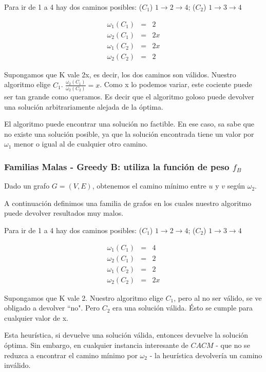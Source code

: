 Para ir de 1 a 4 hay dos caminos posibles: ($C_1$) $1 \rightarrow 2 \rightarrow 4$; ($C_2$) $1 \rightarrow 3 \rightarrow 4$

\begin{eqnarray}
 \omega_1(C_1) &=& 2 	\\ 
 \omega_2(C_1) &=& 2x	\\
 \omega_1(C_2) &=& 2x	\\
 \omega_2(C_2) &=& 2
\end{eqnarray}

Supongamos que K vale 2x, es decir, los dos caminos son válidos. Nuestro algoritmo elige $C_1$.
$\frac{\omega_2(C_1)}{\omega_2(C_2)} = x$.
Como x lo podemos variar, este cociente puede ser tan grande como queramos. Es decir que el algoritmo goloso puede devolver una solución
arbitrariamente alejada de la óptima.

El algoritmo puede encontrar una solución no factible. En ese caso, sa sabe que no existe una solución posible, ya que la solución encontrada tiene un valor por $\omega_1$ menor o igual al de cualquier otro camino.

\clearpage
\subsubsection{Familias Malas - Greedy B: utiliza la función de peso $f_{B}$}\label{subsubsec:greedy-b}
Dado un grafo $G = (V,E)$, obtenemos el camino m\'inimo entre $u$ y $v$ seg\'un $\omega_2$. 

A continuación definimos una familia de grafos en los cuales nuestro algoritmo puede devolver resultados muy malos.

Para ir de 1 a 4 hay dos caminos posibles: ($C_1$) $1 \rightarrow 2 \rightarrow 4$; ($C_2$) $1 \rightarrow 3 \rightarrow 4$

\begin{eqnarray}
 \omega_1(C_1) &=& 4 	\\ 
 \omega_2(C_1) &=& 2	\\
 \omega_1(C_2) &=& 2	\\
 \omega_2(C_2) &=& 2x
\end{eqnarray}

Supongamos que K vale 2. Nuestro algoritmo elige $C_1$, pero al no ser válido, se ve obligado a devolver ``no". Pero $C_2$ era una solución
válida. Ésto se cumple para cualquier valor de x.

Esta heurística, si devuelve una solución válida, entonces devuelve la solución óptima. Sin embargo, en cualquier instancia interesante de $CACM$ - que no se reduzca a encontrar el camino mínimo por $\omega_2$ - la heurística devolvería un camino inválido.

